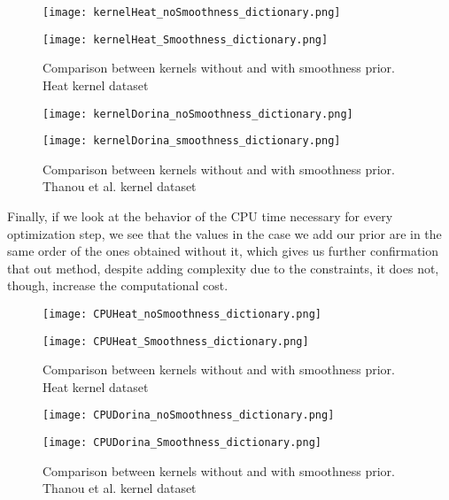 \begin{figure}
  \begin{minipage}[c]{.5\textwidth}
    \centering
    \texttt{[image: kernelHeat\_noSmoothness\_dictionary.png]}
  \end{minipage}
  \begin{minipage}[c]{.5\textwidth}
    \centering
    \texttt{[image: kernelHeat\_Smoothness\_dictionary.png]}
  \end{minipage}
  \caption{Comparison between kernels without and with smoothness prior. Heat kernel dataset}
  \label{fig:kernelHeatDictionary}
\end{figure}

\begin{figure}
  \begin{minipage}[c]{.5\textwidth}
    \centering
    \texttt{[image: kernelDorina\_noSmoothness\_dictionary.png]}
  \end{minipage}
  \begin{minipage}[c]{.5\textwidth}
    \centering
    \texttt{[image: kernelDorina\_smoothness\_dictionary.png]}
  \end{minipage}
  \caption{Comparison between kernels without and with smoothness prior. Thanou et al. kernel dataset}
  \label{fig:kernelDorinaDictionary}
\end{figure}

Finally, if we look at the behavior of the CPU time necessary for every optimization step, we see that the values in the case we add our prior are in the same order of the ones obtained without it, which gives us further confirmation that out method, despite adding complexity due to the constraints, it does not, though, increase the computational cost.

\begin{figure}
  \begin{minipage}[c]{.5\textwidth}
    \centering
    \texttt{[image: CPUHeat\_noSmoothness\_dictionary.png]}
  \end{minipage}
  \begin{minipage}[c]{.5\textwidth}
    \centering
    \texttt{[image: CPUHeat\_Smoothness\_dictionary.png]}
  \end{minipage}
  \caption{Comparison between kernels without and with smoothness prior. Heat kernel dataset}
  \label{fig:CPUHeatDictionary}
\end{figure}

\begin{figure}
  \begin{minipage}[c]{.5\textwidth}
    \centering
    \texttt{[image: CPUDorina\_noSmoothness\_dictionary.png]}
  \end{minipage}
    \begin{minipage}[c]{.5\textwidth}
    \centering
  \texttt{[image: CPUDorina\_Smoothness\_dictionary.png]}
  \end{minipage}
  \caption{Comparison between kernels without and with smoothness prior. Thanou et al. kernel dataset}
  \label{fig:CPUDorinaDictionary}
\end{figure}
